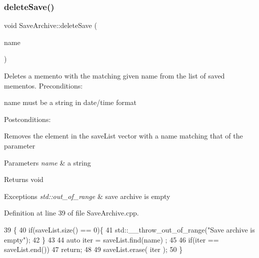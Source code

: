 \subsubsection{\texorpdfstring{delete\+Save()}{deleteSave()}}
{\footnotesize\ttfamily void Save\+Archive\+::delete\+Save (\begin{DoxyParamCaption}\item[{std\+::string}]{name }\end{DoxyParamCaption})}



Deletes a memento with the matching given name from the list of saved mementos. Preconditions\+: 


\begin{DoxyItemize}
\item name must be a string in date/time format
\end{DoxyItemize}

Postconditions\+:
\begin{DoxyItemize}
\item Removes the element in the save\+List vector with a name matching that of the parameter
\end{DoxyItemize}


\begin{DoxyParams}{Parameters}
{\em name} & a string\\
\hline
\end{DoxyParams}
\begin{DoxyReturn}{Returns}
void 
\end{DoxyReturn}

\begin{DoxyExceptions}{Exceptions}
{\em std\+::out\+\_\+of\+\_\+range} & save archive is empty \\
\hline
\end{DoxyExceptions}


Definition at line 39 of file Save\+Archive.\+cpp.


\begin{DoxyCode}
39                                            \{
40     \textcolor{keywordflow}{if}(saveList.size() == 0)\{
41         std::\_\_throw\_out\_of\_range(\textcolor{stringliteral}{"Save archive is empty"});
42     \}
43 
44     \textcolor{keyword}{auto} iter = saveList.find(name) ;
45 
46     \textcolor{keywordflow}{if}(iter == saveList.end())
47         \textcolor{keywordflow}{return};
48 
49     saveList.erase( iter );
50 \}
\end{DoxyCode}
\mbox{\label{classSaveArchive_a144c8a27272d190164ad1f0e9dbdcc01}} 
